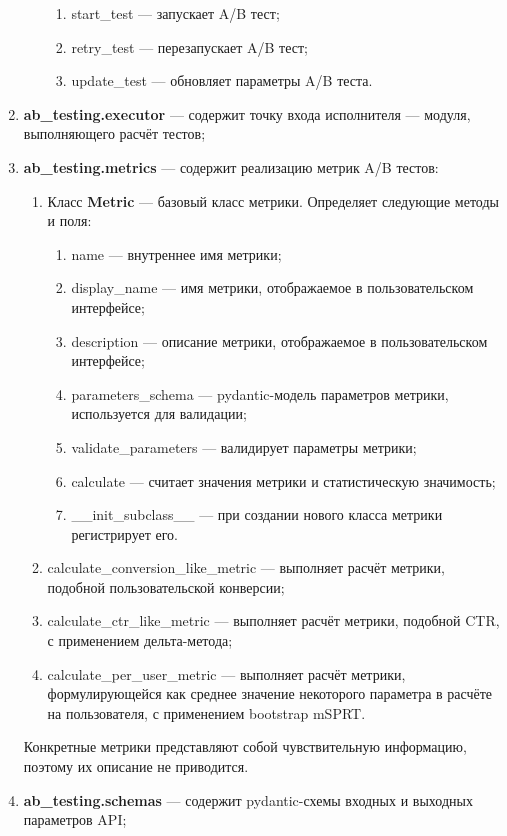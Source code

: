 \documentclass[../document.tex]{subfiles}
\begin{document}
\begin{enumerate}
\begin{enumerate}
\begin{enumerate}
				\item start\_test --- запускает A/B тест;
				\item retry\_test --- перезапускает A/B тест;
				\item update\_test --- обновляет параметры A/B теста.
			\end{enumerate}
		\end{enumerate}
		\item \textbf{ab\_testing.executor} --- содержит точку входа исполнителя --- модуля, выполняющего расчёт тестов;
		\item \textbf{ab\_testing.metrics} --- содержит реализацию метрик A/B тестов:
		\begin{enumerate}
			\item Класс \textbf{Metric} --- базовый класс метрики. Определяет следующие методы и поля:
			\begin{enumerate}
				\item name --- внутреннее имя метрики;
				\item display\_name --- имя метрики, отображаемое в пользовательском интерфейсе;
				\item description --- описание метрики, отображаемое в пользовательском интерфейсе;
				\item parameters\_schema --- pydantic-модель параметров метрики, используется для валидации;
				\item validate\_parameters --- валидирует параметры метрики;
				\item calculate --- считает значения метрики и статистическую значимость;
				\item \_\_init\_subclass\_\_ --- при создании нового класса метрики регистрирует его.
			\end{enumerate}
			\item calculate\_conversion\_like\_metric --- выполняет расчёт метрики, подобной пользовательской конверсии;
			\item calculate\_ctr\_like\_metric --- выполняет расчёт метрики, подобной CTR, с применением дельта-метода;
			\item calculate\_per\_user\_metric --- выполняет расчёт метрики, формулирующейся как среднее значение некоторого параметра в расчёте на пользователя, с применением bootstrap mSPRT.
		\end{enumerate}
		\par Конкретные метрики представляют собой чувствительную информацию, поэтому их описание не приводится.
		\item \textbf{ab\_testing.schemas} --- содержит pydantic-схемы входных и выходных параметров API;

\end{enumerate}
\end{document}
